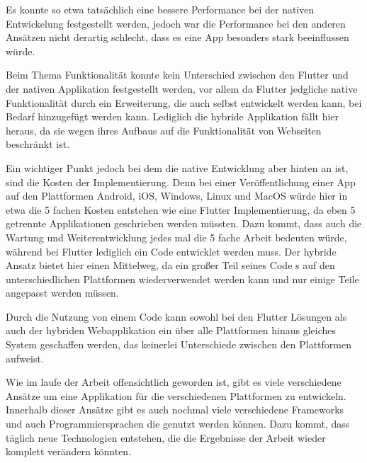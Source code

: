 Es konnte so etwa tatsächlich eine bessere Performance bei der nativen Entwickelung festgestellt werden, jedoch war die Performance bei den anderen Ansätzen nicht derartig schlecht, dass es eine App besonders stark beeinflussen würde. 

Beim Thema Funktionalität konnte kein Unterschied zwischen den Flutter und der nativen Applikation festgestellt werden, vor allem da Flutter jedgliche native Funktionalität durch ein Erweiterung, die auch selbst entwickelt werden kann, bei Bedarf hinzugefügt werden kann. Lediglich die hybride Applikation fällt hier heraus, da sie wegen ihres Aufbaus auf die Funktionalität von Webseiten beschränkt ist.

Ein wichtiger Punkt jedoch bei dem die native Entwicklung aber hinten an ist, sind die Kosten der Implementierung. Denn bei einer Veröffentlichung einer App auf den Plattformen Android, iOS, Windows, Linux und MacOS würde hier in etwa die 5 fachen Kosten entstehen wie eine Flutter Implementierung, da eben 5 getrennte Applikationen geschrieben werden müssten. Dazu kommt, dass auch die Wartung und Weiterentwicklung jedes mal die 5 fache Arbeit bedeuten würde, während bei Flutter lediglich ein Code entwicklet werden muss. Der hybride Ansatz bietet hier einen Mittelweg, da ein großer Teil seines Code s auf den unterschiedlichen Plattformen wiederverwendet werden kann und nur einige Teile angepasst werden müssen. 

Durch die Nutzung von einem Code kann sowohl bei den Flutter Lösungen als auch der hybriden Webapplikation ein über alle Plattformen hinaus gleiches System geschaffen werden, das keinerlei Unterschiede zwischen den Plattformen aufweist. 

Wie im laufe der Arbeit offensichtlich geworden ist, gibt es viele verschiedene Ansätze um eine Applikation für die verschiedenen Plattformen zu entwickeln. Innerhalb dieser Ansätze gibt es auch nochmal viele verschiedene Frameworks und auch Programmiersprachen die genutzt werden können. Dazu kommt, dass täglich neue Technologien entstehen, die die Ergebnisse der Arbeit wieder komplett verändern könnten.


